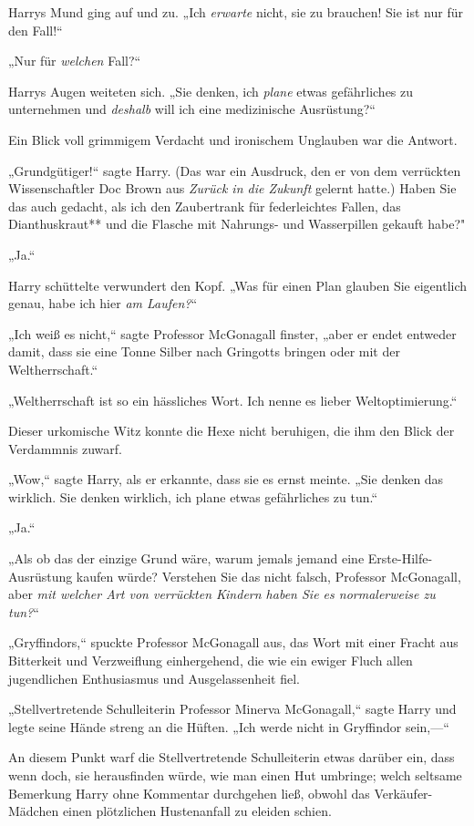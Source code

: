 {Harrys Mund ging auf und zu. „Ich \emph{erwarte} nicht, sie zu brauchen! Sie ist nur für den Fall!“

„Nur für \emph{welchen} Fall?“

Harrys Augen weiteten sich. „Sie denken, ich \emph{plane} etwas gefährliches zu unternehmen und \emph{deshalb} will ich eine medizinische Ausrüstung?“

Ein Blick voll grimmigem Verdacht und ironischem Unglauben war die Antwort.

„Grundgütiger!“ sagte Harry. (Das war ein Ausdruck, den er von dem verrückten Wissenschaftler Doc Brown aus \emph{Zurück in die Zukunft} gelernt hatte.) Haben Sie das auch gedacht, als ich den Zaubertrank für federleichtes Fallen, das Dianthuskraut** und die Flasche mit Nahrungs- und Wasserpillen gekauft habe?"

„Ja.“

Harry schüttelte verwundert den Kopf. „Was für einen Plan glauben Sie eigentlich genau, habe ich hier \emph{am Laufen?}“

„Ich weiß es nicht,“ sagte Professor McGonagall finster, „aber er endet entweder damit, dass sie eine Tonne Silber nach Gringotts bringen oder mit der Weltherrschaft.“

„Weltherrschaft ist so ein hässliches Wort. Ich nenne es lieber Weltoptimierung.“

Dieser urkomische Witz konnte die Hexe nicht beruhigen, die ihm den Blick der Verdammnis zuwarf.

„Wow,“ sagte Harry, als er erkannte, dass sie es ernst meinte. „Sie denken das wirklich. Sie denken wirklich, ich plane etwas gefährliches zu tun.“

„Ja.“

„Als ob das der einzige Grund wäre, warum jemals jemand eine Erste-Hilfe-Ausrüstung kaufen würde? Verstehen Sie das nicht falsch, Professor McGonagall, aber \emph{mit welcher Art von verrückten Kindern haben Sie es normalerweise zu tun?}“

„Gryffindors,“ spuckte Professor McGonagall aus, das Wort mit einer Fracht aus Bitterkeit und Verzweiflung einhergehend, die wie ein ewiger Fluch allen jugendlichen Enthusiasmus und Ausgelassenheit fiel.

„Stellvertretende Schulleiterin Professor Minerva McGonagall,“ sagte Harry und legte seine Hände streng an die Hüften. „Ich werde nicht in Gryffindor sein,—“

An diesem Punkt warf die Stellvertretende Schulleiterin etwas darüber ein, dass wenn doch, sie herausfinden würde, wie man einen Hut umbringe; welch seltsame Bemerkung Harry ohne Kommentar durchgehen ließ, obwohl das Verkäufer-Mädchen einen plötzlichen Hustenanfall zu eleiden schien.

}
